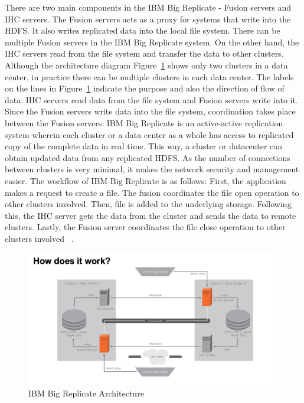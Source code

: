 There are two main components in the IBM Big Replicate - Fusion servers and IHC 
servers. The Fusion servers acts as a proxy for systems that write into the 
HDFS. It also writes replicated data into the local file system. There can be 
multiple Fusion servers in the IBM Big Replicate system. On the other hand, the 
IHC servers read from the file system and transfer the data to other clusters.
Although the architecture diagram Figure~\ref{f:architecture} shows only two 
clusters in a data center, in practice there can be multiple clusters in each 
data center. The labels on the lines in Figure~\ref{f:architecture} indicate the
purpose and also the direction of flow of data. IHC servers read data from the 
file system and Fusion servers write into it. Since the Fusion servers write
data into the file system, coordination takes place between the Fusion servers.
IBM Big Replicate is an active-active replication system wherein each cluster or
a data center as a whole has access to replicated copy of the complete data in 
real time. This way, a cluster or datacenter can obtain updated data from any 
replicated HDFS. As the number of connections between clusters is very minimal,
it makes the network security and management easier. The workflow of IBM Big 
Replicate is as follows:
First, the application makes a request to create a file. The fusion coordinates 
the file open operation to other clusters involved. Then, file is added to the 
underlying storage. Following this, the IHC server gets the data from the 
cluster and sends the data to remote clusters. Lastly, the Fusion server 
coordinates the file close operation to other clusters involved 
~\cite{hid-sp18-408-IBMBigReplicate-architecture}.

\begin{figure}[!ht]
  \centering\includegraphics[width=\columnwidth]
  {image/IBM-Replicate-Architecture.png}
  \caption{IBM Big Replicate Architecture
  ~\cite{hid-sp18-408-IBMBigReplicate-architecture}}\label{f:architecture}
\end{figure}

